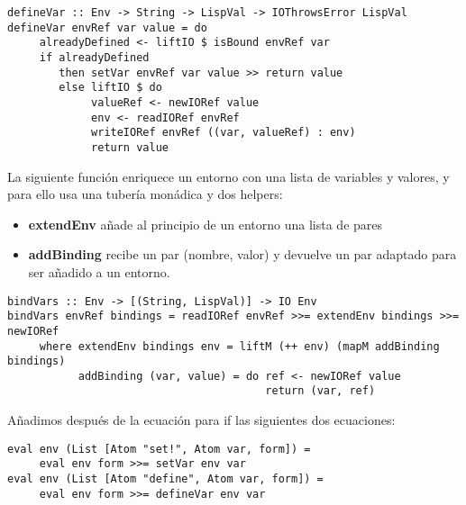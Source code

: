 \begin{minipage}{\linewidth}
\begin{footnotesize}
\begin{lstlisting}[frame=single]
defineVar :: Env -> String -> LispVal -> IOThrowsError LispVal
defineVar envRef var value = do
     alreadyDefined <- liftIO $ isBound envRef var
     if alreadyDefined
        then setVar envRef var value >> return value
        else liftIO $ do
             valueRef <- newIORef value
             env <- readIORef envRef
             writeIORef envRef ((var, valueRef) : env)
             return value
\end{lstlisting}
\end{footnotesize}
\end{minipage}

La siguiente funci\'on enriquece un entorno con una lista de variables y valores, y para ello usa una tuber\'ia mon\'adica y dos helpers:

\begin{itemize}
  \item \textbf{extendEnv} a\~{n}ade al principio de un entorno una lista de pares 
  \item \textbf{addBinding} recibe un par (nombre, valor) y devuelve un par adaptado para ser a\~{n}adido a un entorno.
\end{itemize}

\begin{minipage}{\linewidth}
\begin{scriptsize}
\begin{lstlisting}[frame=single]
bindVars :: Env -> [(String, LispVal)] -> IO Env
bindVars envRef bindings = readIORef envRef >>= extendEnv bindings >>= newIORef
     where extendEnv bindings env = liftM (++ env) (mapM addBinding bindings)
           addBinding (var, value) = do ref <- newIORef value
                                        return (var, ref)
\end{lstlisting}
\end{scriptsize}
\end{minipage}

A\~{n}adimos despu\'es de la ecuaci\'on para if las siguientes dos ecuaciones:\\

\begin{minipage}{\linewidth}
\begin{footnotesize}
\begin{lstlisting}[frame=single]
eval env (List [Atom "set!", Atom var, form]) =
     eval env form >>= setVar env var
eval env (List [Atom "define", Atom var, form]) =
     eval env form >>= defineVar env var
\end{lstlisting}
\end{footnotesize}
\end{minipage}

